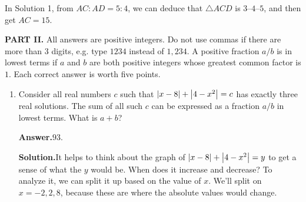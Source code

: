 \documentclass[11pt,paper=letter]{scrartcl}
\newcommand{\ans}[1]{{\sffamily \bfseries Answer.}\;\(\boxed{\text{#1}}\).}
\newcommand{\sol}{{\sffamily \bfseries Solution.}\;}
\newenvironment{rem}%
{\noindent \ignorespaces \small \sffamily \sansmath {\bfseries Remark.}}%
{\ignorespacesafterend}
\begin{document}
\begin{enumerate}[align=left,leftmargin=*]
\begin{rem}
In Solution 1, from $AC : AD = 5 : 4$, we can deduce that $\triangle ACD$ is $3$--$4$--$5$, and then get $AC = 15$.
\end{rem}

\end{enumerate}

\noindent\textbf{PART II.} All answers are positive integers. Do not use commas if there are more than $3$ digits, e.g. type $1234$ instead of $1,234$. A positive fraction $a/b$ is in lowest terms if $a$ and $b$ are both positive integers whose greatest common factor is $1$. Each correct answer is worth five points.

\begin{enumerate}[align=left,leftmargin=*,resume]

\item Consider all real numbers $c$ such that $\left\lvert x-8 \right\rvert + \left\lvert 4-x^2 \right\rvert = c$ has exactly three real solutions. The sum of all such $c$ can be expressed as a fraction $a/b$ in lowest terms. What is $a + b$?

\ans{$93$}

\sol It helps to think about the graph of $\left\lvert x-8 \right\rvert + \left\lvert 4-x^2 \right\rvert = y$ to get a sense of what the $y$ would be. When does it increase and decrease? To analyze it, we can split it up based on the value of $x$. We'll split on $x = -2, 2, 8$, because these are where the absolute values would change.



\end{enumerate}
\end{document}
